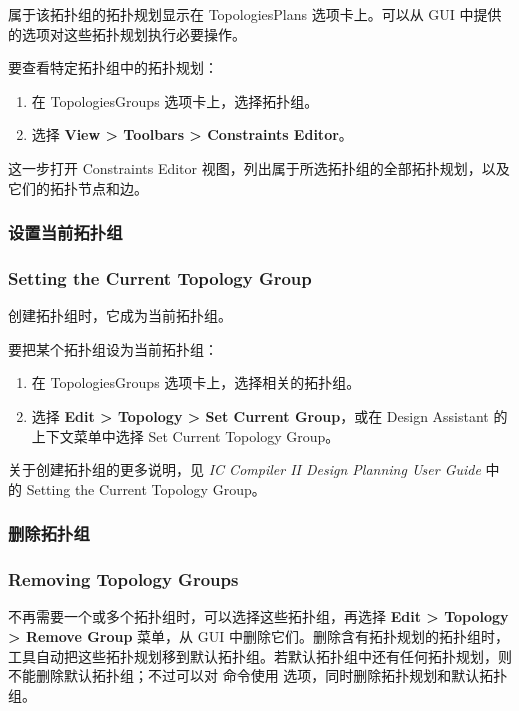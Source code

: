 属于该拓扑组的拓扑规划显示在 TopologiesPlans 选项卡上。可以从 GUI 中提供的选项对这些拓扑规划执行必要操作。

要查看特定拓扑组中的拓扑规划：
\begin{enumerate}
  \item 在 TopologiesGroups 选项卡上，选择拓扑组。
  \item 选择 \textbf{View > Toolbars > Constraints Editor}。
\end{enumerate}

这一步打开 Constraints Editor 视图，列出属于所选拓扑组的全部拓扑规划，以及它们的拓扑节点和边。

\subsubsection{设置当前拓扑组}
\subsubsection*{Setting the Current Topology Group}

创建拓扑组时，它成为当前拓扑组。

要把某个拓扑组设为当前拓扑组：
\begin{enumerate}
  \item 在 TopologiesGroups 选项卡上，选择相关的拓扑组。
  \item 选择 \textbf{Edit > Topology > Set Current Group}，或在 Design Assistant 的上下文菜单中选择 Set Current Topology Group。
\end{enumerate}

\begin{seeAlsoBox}
关于创建拓扑组的更多说明，见 \emph{IC Compiler II Design Planning User Guide} 中的 Setting the Current Topology Group。
\end{seeAlsoBox}

\subsubsection{删除拓扑组}
\subsubsection*{Removing Topology Groups}

不再需要一个或多个拓扑组时，可以选择这些拓扑组，再选择 \textbf{Edit > Topology > Remove Group} 菜单，从 GUI 中删除它们。删除含有拓扑规划的拓扑组时，工具自动把这些拓扑规划移到默认拓扑组。若默认拓扑组中还有任何拓扑规划，则不能删除默认拓扑组；不过可以对  命令使用  选项，同时删除拓扑规划和默认拓扑组。

